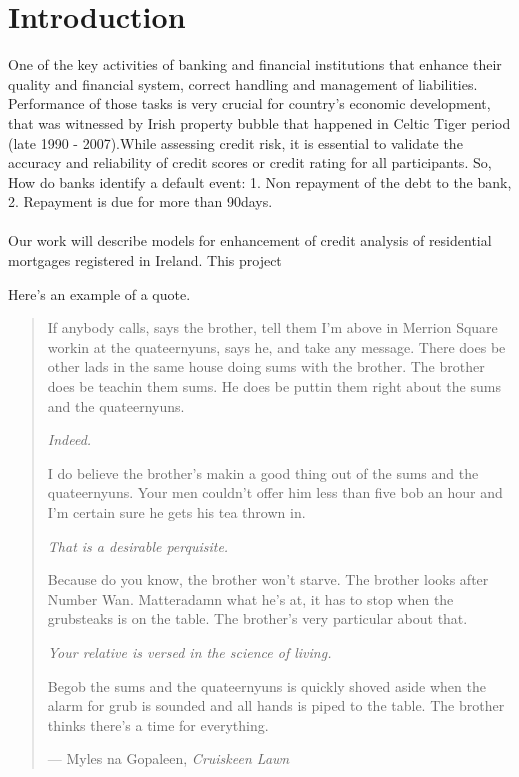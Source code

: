 %
%
%
%

\chapter{Introduction}\label{C.intro}
One of the key activities of banking and financial institutions that enhance their quality and financial system, correct handling and management of liabilities. Performance of those tasks is very crucial for country's economic development, that was witnessed by Irish property bubble that happened in Celtic Tiger period (late 1990 - 2007).While assessing credit risk, it is essential to validate the accuracy and reliability of credit scores or credit rating for all participants. So, How do banks identify a default event: 1. Non repayment of the debt to the bank, 2. Repayment is due for more than 90days.\\\\
Our work will describe models for enhancement of credit analysis of residential mortgages registered in Ireland. This project 


Here's an example of a quote.

\begin{quote}
If anybody calls, says the brother, tell them I'm above in Merrion Square workin at the
quateernyuns, says he, and take any message.  There does be other lads in the same house
doing sums with the brother.  The brother does be teachin them sums.  He does be puttin
them right about the sums and the quateernyuns.

\textit{Indeed.}

I do believe the brother's makin a good thing out of the sums and the quateernyuns.  Your
men couldn't offer him less than five bob an hour and I'm certain sure he gets his tea
thrown in.

\textit{That is a desirable perquisite.}

Because do you know, the brother won't starve.  The brother looks after Number Wan.
Matteradamn what he's at, it has to stop when the grubsteaks is on the table.  The brother's
very particular about that.

\textit{Your relative is versed in the science of living.}

Begob the sums and the quateernyuns is quickly shoved aside when the alarm for grub is sounded
and all hands is piped to the table.  The brother thinks there's a time for everything.

\hspace{2cm}--- Myles na Gopaleen, \emph{Cruiskeen Lawn}
\end{quote}


